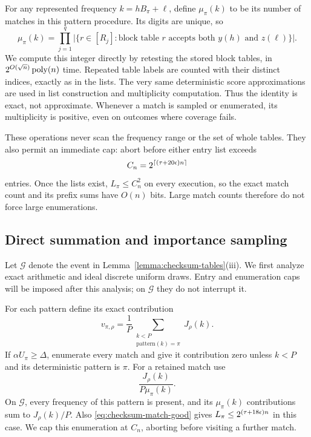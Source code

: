 For any represented frequency $k=hB_\pi+\ell$, define
$\mu_\pi(k)$ to be its number of matches in this pattern procedure.
Its digits are unique, so
\begin{equation}
 \mu_\pi(k)=\prod_{j=1}^q
 \bigl|\{r\in[R_j]:\text{block table }r
       \text{ accepts both }y(h)\text{ and }z(\ell)\}\bigr|.
 \label{eq:checksum-multiplicity}
\end{equation}
We compute this integer directly by retesting the stored block tables,
in $2^{O(\sqrt n)}\operatorname{poly}(n)$ time.  Repeated table labels are counted
with their distinct indices, exactly as in the lists.
The very same deterministic score approximations are used in list
construction and multiplicity computation.  Thus the identity is
exact, not approximate.  Whenever a match is sampled or enumerated,
its multiplicity is positive, even on outcomes where coverage fails.

These operations never scan the frequency range or the set of whole
tables.  They also permit an immediate cap: abort before either entry
list exceeds
\begin{equation}
 C_n=2^{\lceil(\tau+20\epsilon)n\rceil}
 \label{eq:checksum-cap}
\end{equation}
entries.  Once the lists exist, $L_\pi\le C_n^2$ on every execution,
so the exact match count and its prefix sums have $O(n)$ bits.
Large match counts therefore do not force large enumerations.

\subsection{Direct summation and importance sampling}

Let $\mathcal G$ denote the event in
Lemma~\ref{lemma:checksum-tables}\textup{(iii)}.  We first analyze
exact arithmetic and ideal discrete uniform draws.  Entry and
enumeration caps will be imposed after this analysis; on $\mathcal G$
they do not interrupt it.

For each pattern define its exact contribution
\[
 v_{\pi,\rho}=\frac1P
   \sum_{\substack{k<P\\\text{pattern}(k)=\pi}}J_\rho(k).
\]
If $\alpha U_\pi\ge\Delta$, enumerate every match and give it
contribution zero unless $k<P$ and its deterministic pattern is
$\pi$.  For a retained match use
\begin{equation}
 \frac{J_\rho(k)}{P\mu_\pi(k)}.
 \label{eq:checksum-direct-weight}
\end{equation}
On $\mathcal G$, every frequency of this pattern is present, and its
$\mu_\pi(k)$ contributions sum to $J_\rho(k)/P$.
Also \eqref{eq:checksum-match-good} gives
$L_\pi\le2^{(\tau+18\epsilon)n}$ in this case.  We cap this enumeration
at $C_n$, aborting before visiting a further match.

